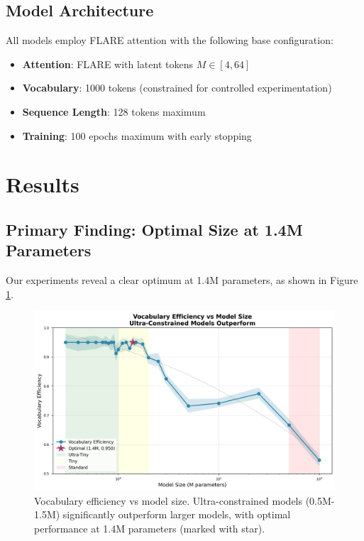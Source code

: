 \documentclass[10pt,twocolumn]{article}
\begin{document}
\subsection{Model Architecture}

All models employ FLARE attention \cite{flare2024} with the following base configuration:
\begin{itemize}
    \item \textbf{Attention}: FLARE with latent tokens $M \in [4, 64]$
    \item \textbf{Vocabulary}: 1000 tokens (constrained for controlled experimentation)
    \item \textbf{Sequence Length}: 128 tokens maximum
    \item \textbf{Training}: 100 epochs maximum with early stopping
\end{itemize}

\section{Results}

\subsection{Primary Finding: Optimal Size at 1.4M Parameters}

Our experiments reveal a clear optimum at 1.4M parameters, as shown in Figure \ref{fig:efficiency}.

\begin{figure}[h]
    \centering
    \includegraphics[width=\columnwidth]{figures/vocabulary_efficiency.png}
    \caption{Vocabulary efficiency vs model size. Ultra-constrained models (0.5M-1.5M) significantly outperform larger models, with optimal performance at 1.4M parameters (marked with star).}
    \label{fig:efficiency}
\end{figure}
\end{document}
